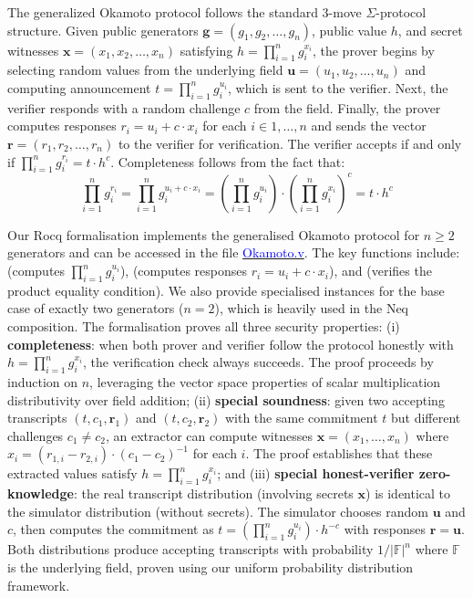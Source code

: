 \documentclass[sigconf,anonymous,review]{acmart}
\begin{document}
The generalized Okamoto protocol follows the standard 3-move $\Sigma$-protocol structure. Given public generators $\mathbf{g} = (g_1, g_2, \ldots, g_n)$, public value $h$, and secret witnesses $\mathbf{x} = (x_1, x_2, \ldots, x_n)$ satisfying $h = \prod_{i=1}^{n} g_i^{x_i}$, the prover begins by selecting random values from the underlying field $\mathbf{u} = (u_1, u_2, \ldots, u_n)$ and computing announcement $t = \prod_{i=1}^{n} g_i^{u_i}$, which is sent to the verifier. Next, the verifier responds with a random challenge $c$ from the field. Finally, the prover computes responses $r_i = u_i + c \cdot x_i$ for each $i \in {1, \ldots, n}$ and sends the vector $\mathbf{r} = (r_1, r_2, \ldots, r_n)$ to the verifier for verification. The verifier accepts if and only if 
$\prod_{i=1}^{n} g_i^{r_i} = t \cdot h^c$. Completeness follows from the fact that:
\[
\prod_{i=1}^{n} g_i^{r_i} = \prod_{i=1}^{n} g_i^{u_i + c \cdot x_i} = 
\left(\prod_{i=1}^{n} g_i^{u_i}\right) \cdot \left(\prod_{i=1}^{n} g_i^{x_i}\right)^c = t \cdot h^c
\]

Our Rocq formalisation implements the generalised Okamoto protocol for $n \geq 2$ generators and can be accessed in the file \href{https://anonymous.4open.science/r/SigmaProtocol-EBA5/src/Crypto/Okamoto.v}{\textcolor{blue}{Okamoto.v}}. The key functions include: \texttt{} (computes $\prod_{i=1}^{n} g_i^{u_i}$), \texttt{} (computes responses $r_i = u_i + c \cdot x_i$), and 
\texttt{} (verifies the product equality condition). We also provide specialised instances for the base case of exactly two generators ($n=2$), which is heavily used in the Neq composition. The formalisation proves all three security properties: (i) \textbf{completeness}: 
when both prover and verifier follow the protocol honestly with $h = \prod_{i=1}^{n} g_i^{x_i}$, 
the verification check always succeeds. The proof proceeds by induction on $n$, leveraging the 
vector space properties of scalar multiplication distributivity over field addition; (ii) \textbf{special soundness}: 
given two accepting transcripts $(t, c_1, \mathbf{r}_1)$ and $(t, c_2, \mathbf{r}_2)$ with 
the same commitment $t$ but different challenges $c_1 \neq c_2$, an extractor can compute 
witnesses $\mathbf{x} = (x_1, \ldots, x_n)$ where 
$x_i = (r_{1,i} - r_{2,i}) \cdot (c_1 - c_2)^{-1}$ for each $i$. The proof establishes that 
these extracted values satisfy $h = \prod_{i=1}^{n} g_i^{x_i}$; and (iii) \textbf{special honest-verifier zero-knowledge}: 
the real transcript distribution (involving secrets $\mathbf{x}$) is identical to the simulator 
distribution (without secrets). The simulator chooses random $\mathbf{u}$ and $c$, then computes 
the commitment as $t = \left(\prod_{i=1}^{n} g_i^{u_i}\right) \cdot h^{-c}$ with responses 
$\mathbf{r} = \mathbf{u}$. Both distributions produce accepting transcripts with probability 
$1/|\mathbb{F}|^n$ where $\mathbb{F}$ is the underlying field, proven using our uniform probability 
distribution framework.
\end{document}
